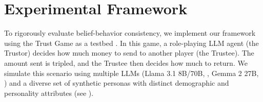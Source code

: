\documentclass{article} %
\begin{document}




\section{Experimental Framework}
\label{sec:framework}

To rigorously evaluate belief-behavior consistency, we implement our framework using the Trust Game as a testbed \citep{berg1995trust}. In this game, a role-playing LLM agent (the Trustor) decides how much money to send to another player (the Trustee). The amount sent is tripled, and the Trustee then decides how much to return. We simulate this scenario using multiple LLMs (Llama 3.1 8B/70B, \citep{grattafiori2024llama}, Gemma 2 27B, \citep{team2024gemma}) and a diverse set of synthetic personas with distinct demographic and personality attributes (see ).
\end{document}

